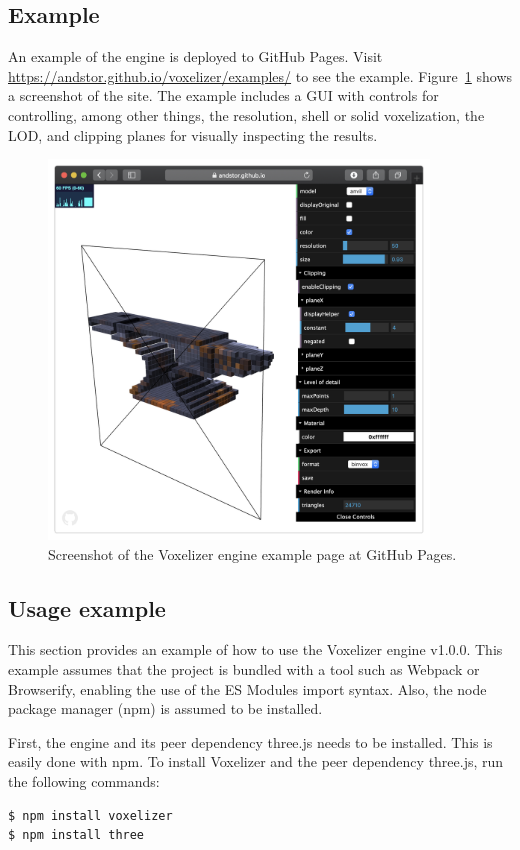 \subsection{Example}
An example of the engine is deployed to GitHub Pages. Visit \url{https://andstor.github.io/voxelizer/examples/} to see the example. Figure~\ref{fig:voxelizer-example} shows a screenshot of the site. The example includes a GUI with controls for controlling, among other things, the resolution, shell or solid voxelization, the LOD, and clipping planes for visually inspecting the results.
\begin{figure}[ht]
    \centering
    \includegraphics[width=0.9\textwidth]{sections/result/figures/voxelizer-example.png}
    \caption{Screenshot of the Voxelizer engine example page at GitHub Pages.}
    \label{fig:voxelizer-example}
\end{figure}

\subsection{Usage example}
This section provides an example of how to use the Voxelizer engine v1.0.0. This example assumes that the project is bundled with a tool such as Webpack or Browserify, enabling the use of the ES Modules import syntax. Also, the node package manager (npm) is assumed to be installed.

First, the engine and its peer dependency three.js needs to be installed. This is easily done with npm. To install Voxelizer and the peer dependency three.js, run the following commands:
\begin{verbatim}
$ npm install voxelizer
$ npm install three
\end{verbatim}

